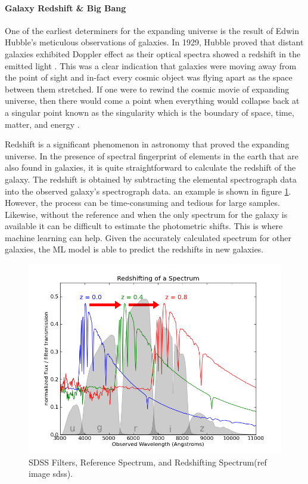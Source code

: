 \paragraph{Galaxy Redshift \& Big Bang} One of the earliest determiners for the expanding universe is the result of Edwin Hubble's meticulous observations of galaxies. In 1929, Hubble proved that distant galaxies exhibited Doppler effect as their optical spectra showed a redshift in the emitted light \parencite*{hubble_relation_1929}. This was a clear indication that galaxies were moving away from the point of sight and in-fact every cosmic object was flying apart as the space between them stretched. If one were to rewind the cosmic movie of expanding universe, then there would come a point when everything would collapse back at a singular point known as the singularity which is the boundary of space, time, matter, and energy \parencite[18]{davies_god_2007}.

Redshift is a significant phenomenon in astronomy that proved the expanding universe. In the presence of spectral fingerprint of elements in the earth that are also found in galaxies, it is quite straightforward to calculate the redshift of the galaxy. The redshift is obtained by subtracting the elemental spectrograph data into the observed galaxy's spectrograph data. an example is shown in figure \ref{fig:rsp}. However, the process can be time-consuming and tedious for large samples. Likewise, without the reference and when the only spectrum for the galaxy is available it can be difficult to estimate the photometric shifts. This is where machine learning can help. Given the accurately calculated spectrum for other galaxies, the ML model is able to predict the redshifts in new galaxies.

\begin{figure}[H]
	\centering
	\includegraphics[width=\linewidth,keepaspectratio]{images/misc/plot_sdss_filters_2.png}
	\caption{SDSS Filters, Reference Spectrum, and Redshifting Spectrum(ref image sdss).}
	\label{fig:rsp}
\end{figure}

